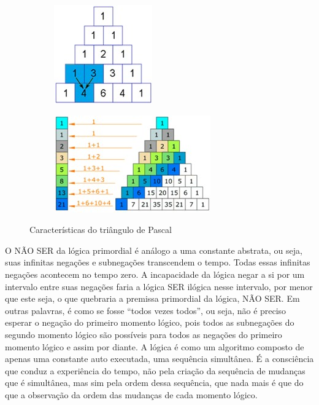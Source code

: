 \begin{figure}[H]
\centering
	\begin{subfigure}[H]{0.47\linewidth}
	\centering
	\includegraphics[width=.55\linewidth]{sections/images/pascal_triangle.jpg}
	\caption{}
	\label{fig:pascal_triangle}
	\end{subfigure}
\hfill
	\begin{subfigure}[H]{0.47\linewidth}
	\centering
	\includegraphics[width=.9\linewidth]{sections/images/pascal_triangle_fibonacci.jpg}
	\caption{}
	\label{fig:pascal_triangle_fibonacci}
	\end{subfigure}%
\caption{Características do triângulo de Pascal}

\end{figure}

O NÃO SER da lógica primordial é análogo a uma constante abstrata, ou seja, suas infinitas negações e subnegações transcendem o tempo. Todas essas infinitas negações acontecem no tempo zero. A incapacidade da lógica negar a si por um intervalo entre suas negações faria a lógica SER ilógica nesse intervalo, por menor que este seja, o que quebraria a premissa primordial da lógica, NÃO SER. Em outras palavras, é como se fosse “todos vezes todos”, ou seja, não é preciso esperar o negação do primeiro momento lógico, pois todos as subnegações do segundo momento lógico são possíveis para todos as negações do primeiro momento lógico e assim por diante. A lógica é como um algoritmo composto de apenas uma constante auto executada, uma sequência simultânea. É a consciência que conduz a experiência do tempo, não pela criação da sequência de mudanças que é simultânea, mas sim pela ordem dessa sequência, que nada mais é que do que a observação da ordem das mudanças de cada momento lógico.

